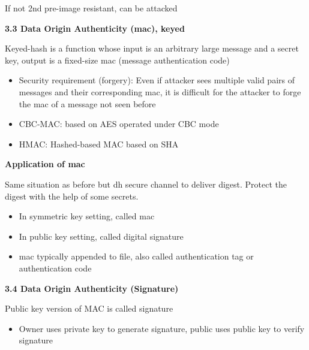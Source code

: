 \documentclass[landscape,a4paper]{extarticle}
\begin{document}
\begin{multicols*}{5}
    If not 2nd pre-image resistant, can be attacked

    \textbf{3.3 Data Origin Authenticity (mac), keyed}

    Keyed-hash is a function whose input is an arbitrary large message and a secret key, output is a
    fixed-size mac (message authentication code)
    \begin{itemize}
        \item Security requirement (forgery): Even if attacker sees multiple valid pairs of messages and their
        corresponding mac, it is difficult for the attacker to forge the mac of a message not seen before
        \item CBC-MAC: based on AES operated under CBC mode
        \item HMAC: Hashed-based MAC based on SHA
    \end{itemize}

    \textbf{Application of mac}

    Same situation as before but dh secure channel to deliver digest. Protect the digest
    with the help of some secrets.
    \begin{itemize}
        \item In symmetric key setting, called mac
        \item In public key setting, called digital signature
        \item mac typically appended to file, also called authentication tag or authentication code
    \end{itemize}

    \textbf{3.4 Data Origin Authenticity (Signature)}

    Public key version of MAC is called signature
    \begin{itemize}
        \item Owner uses private key to generate signature, public uses public key to verify
        signature
    \end{itemize}


\end{multicols*}
\end{document}
